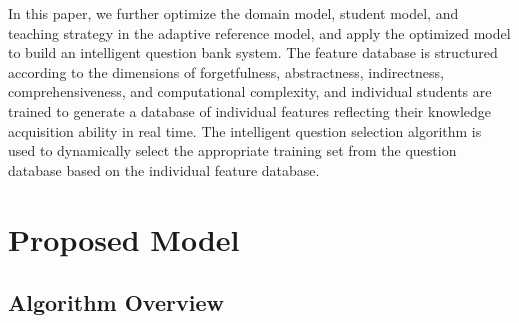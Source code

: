 In this paper, we further optimize the domain model, student model, and teaching strategy in the adaptive reference model, and apply the optimized model to build an intelligent question bank system. The feature database is structured according to the dimensions of forgetfulness, abstractness, indirectness, comprehensiveness, and computational complexity, and individual students are trained to generate a database of individual features reflecting their knowledge acquisition ability in real time. The intelligent question selection algorithm is used to dynamically select the appropriate training set from the question database based on the individual feature database.

\section{Proposed Model}
\subsection{Algorithm Overview}


